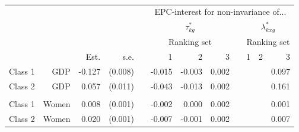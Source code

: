 \documentclass[letterpaper,12pt]{article}
\begin{document}
\begin{table}
	\begin{tabular}{lrrrrrrrrrrr}
	\hline
		&&&&&\multicolumn{7}{c}{EPC-interest for non-invariance of...}\\
	&&&&&\multicolumn{3}{c}{$\tau^{*}_{k g}$} && \multicolumn{3}{c}{$\lambda^{*}_{k x g}$}\\
			\hline
		&&&&&\multicolumn{3}{c}{Ranking set} && \multicolumn{3}{c}{Ranking set}\\
\cline{3-4}\cline{6-8}\cline{10-12}
			&	&	Est.&	s.e.&	&	1  &	2  &	3  &&	  1&	2 &	3\\
				\hline
Class 1&	GDP&	-0.127&	(0.008)&	&	-0.015&	-0.003&	0.002&&	&	&	0.097\\
Class 2&	GDP&	0.057&	(0.011)&	&	-0.043&	-0.013&	0.002&&	&	&	0.161\\
\\
Class 	1&	Women&	0.008&	(0.001)&	&	-0.002&	0.000&	0.002&	&&	&	0.001\\
Class 	2&	Women&	0.020&	(0.001)&	&	-0.007&	-0.001&	0.002&	&&	&	0.007\\
\hline
	\end{tabular}
	\caption{\label{tab:epc-interest-model2}}

\end{table}
\end{document}
